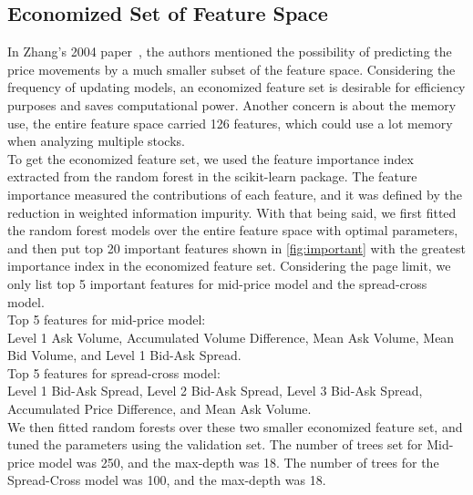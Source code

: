 \documentclass[11pt]{article}
\begin{document}
\subsection{Economized Set of Feature Space}
\label{subsection:economic}
In Zhang's 2004 paper~\cite{financesvm}, the authors mentioned the possibility of predicting the price movements by a much smaller subset of the feature space. Considering the frequency of updating models, an economized feature set is desirable for efficiency purposes and saves computational power. Another concern is about the memory use, the entire feature space carried 126 features, which could use a lot memory when analyzing multiple stocks.\\
To get the economized feature set, we used the feature importance index extracted from the random forest in the scikit-learn package. The feature importance measured the contributions of each feature, and it was defined by the reduction in weighted information impurity. With that being said, we first fitted the random forest models over the entire feature space with optimal parameters, and then put top 20 important features shown in \ref{fig:important} with the greatest importance index in the economized feature set. Considering the page limit, we only list top 5 important features for mid-price model and the spread-cross model.\\
Top 5 features for mid-price model:\\
Level 1 Ask Volume, Accumulated Volume Difference, Mean Ask Volume, Mean Bid Volume, and Level 1 Bid-Ask Spread.\\
Top 5 features for spread-cross model:\\
Level 1 Bid-Ask Spread, Level 2 Bid-Ask Spread, Level 3 Bid-Ask Spread, Accumulated Price Difference, and Mean Ask Volume.\\
We then fitted random forests over these two smaller economized feature set, and tuned the parameters using the validation set. The number of trees set for Mid-price model was 250, and the max-depth was 18. The number of trees for the Spread-Cross model was 100, and the max-depth was 18.
\end{document}
